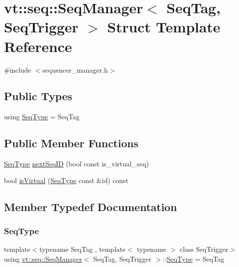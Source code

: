 \hypertarget{structvt_1_1seq_1_1_seq_manager}{}\section{vt\+:\+:seq\+:\+:Seq\+Manager$<$ Seq\+Tag, Seq\+Trigger $>$ Struct Template Reference}
\label{structvt_1_1seq_1_1_seq_manager}


{\ttfamily \#include $<$sequencer\+\_\+manager.\+h$>$}

\subsection*{Public Types}
\begin{DoxyCompactItemize}
\item 
using \hyperlink{structvt_1_1seq_1_1_seq_manager_a46a40595599aa666e9cf9f46ee30cfde}{Seq\+Type} = Seq\+Tag
\end{DoxyCompactItemize}
\subsection*{Public Member Functions}
\begin{DoxyCompactItemize}
\item 
\hyperlink{structvt_1_1seq_1_1_seq_manager_a46a40595599aa666e9cf9f46ee30cfde}{Seq\+Type} \hyperlink{structvt_1_1seq_1_1_seq_manager_ae234b99884c47802516dece955b66e56}{next\+Seq\+ID} (bool const is\+\_\+virtual\+\_\+seq)
\item 
bool \hyperlink{structvt_1_1seq_1_1_seq_manager_a9a5b739e65924f54a962b75435e53dd3}{is\+Virtual} (\hyperlink{structvt_1_1seq_1_1_seq_manager_a46a40595599aa666e9cf9f46ee30cfde}{Seq\+Type} const \&id) const
\end{DoxyCompactItemize}


\subsection{Member Typedef Documentation}
\mbox{\label{structvt_1_1seq_1_1_seq_manager_a46a40595599aa666e9cf9f46ee30cfde}} 
\subsubsection{\texorpdfstring{Seq\+Type}{SeqType}}
{\footnotesize\ttfamily template$<$typename Seq\+Tag , template$<$ typename $>$ class Seq\+Trigger$>$ \\
using \hyperlink{structvt_1_1seq_1_1_seq_manager}{vt\+::seq\+::\+Seq\+Manager}$<$ Seq\+Tag, Seq\+Trigger $>$\+::\hyperlink{structvt_1_1seq_1_1_seq_manager_a46a40595599aa666e9cf9f46ee30cfde}{Seq\+Type} =  Seq\+Tag}



